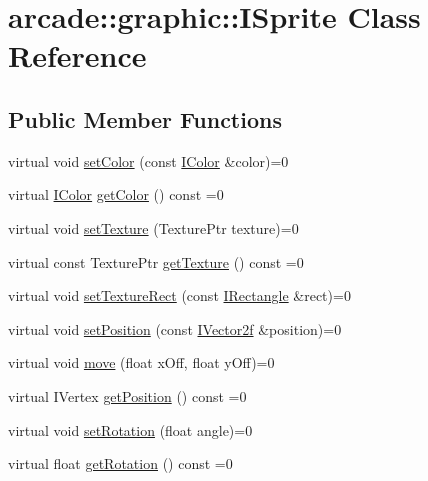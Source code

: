 \hypertarget{classarcade_1_1graphic_1_1_i_sprite}{}\section{arcade\+::graphic\+::I\+Sprite Class Reference}
\label{classarcade_1_1graphic_1_1_i_sprite}
\subsection*{Public Member Functions}
\begin{DoxyCompactItemize}
\item 
virtual void \mbox{\hyperlink{classarcade_1_1graphic_1_1_i_sprite_a3746d3ae251a8377d4156c27dfe66a8c}{set\+Color}} (const \mbox{\hyperlink{classarcade_1_1graphic_1_1_i_color}{I\+Color}} \&color)=0
\item 
virtual \mbox{\hyperlink{classarcade_1_1graphic_1_1_i_color}{I\+Color}} \mbox{\hyperlink{classarcade_1_1graphic_1_1_i_sprite_ac1d2f9de8387466857b06ad49bacae45}{get\+Color}} () const =0
\item 
virtual void \mbox{\hyperlink{classarcade_1_1graphic_1_1_i_sprite_ad8b153b29798676f0ff3895713e11e1a}{set\+Texture}} (Texture\+Ptr texture)=0
\item 
virtual const Texture\+Ptr \mbox{\hyperlink{classarcade_1_1graphic_1_1_i_sprite_a7e2a1006497060ad69d01055c2308967}{get\+Texture}} () const =0
\item 
virtual void \mbox{\hyperlink{classarcade_1_1graphic_1_1_i_sprite_a72f62ffd389e825c7791fa034eb8c22e}{set\+Texture\+Rect}} (const \mbox{\hyperlink{classarcade_1_1graphic_1_1_i_rectangle}{I\+Rectangle}} \&rect)=0
\item 
virtual void \mbox{\hyperlink{classarcade_1_1graphic_1_1_i_sprite_a51a53315af10283b414cb318a0a940ff}{set\+Position}} (const \mbox{\hyperlink{classarcade_1_1graphic_1_1_i_vector2f}{I\+Vector2f}} \&position)=0
\item 
virtual void \mbox{\hyperlink{classarcade_1_1graphic_1_1_i_sprite_ae311414d5a500f18d66a201cc0063681}{move}} (float x\+Off, float y\+Off)=0
\item 
virtual I\+Vertex \mbox{\hyperlink{classarcade_1_1graphic_1_1_i_sprite_a44047f1697c3bebbf808a239677d33e1}{get\+Position}} () const =0
\item 
virtual void \mbox{\hyperlink{classarcade_1_1graphic_1_1_i_sprite_a8290c8345bc4ab3d3a20a7539bf3808e}{set\+Rotation}} (float angle)=0
\item 
virtual float \mbox{\hyperlink{classarcade_1_1graphic_1_1_i_sprite_a2ea4c49f5da9b17a500074ab1378f7ff}{get\+Rotation}} () const =0
\end{DoxyCompactItemize}


